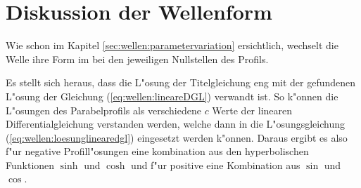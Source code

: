 \section{Diskussion der Wellenform}
\label{sec:wellen:diskussionwellenform}

Wie schon im Kapitel \ref{sec:wellen:parametervariation} ersichtlich, 
wechselt die Welle ihre Form im bei den jeweiligen Nullstellen des Profils.

Es stellt sich heraus, dass die L"osung der Titelgleichung eng mit der 
gefundenen L"osung der Gleichung (\ref{eq:wellen:lineareDGL}) verwandt ist. So 
k"onnen die L"osungen des Parabelprofils als verschiedene $c$ Werte der 
linearen Differentialgleichung verstanden werden, welche dann in die 
L"osungsgleichung (\ref{eq:wellen:loesunglinearedgl}) eingesetzt werden 
k"onnen. Daraus ergibt es also f"ur negative Profill"osungen eine kombination 
aus den hyperbolischen Funktionen $\sinh$ und $\cosh$ und f"ur positive eine 
Kombination aus $\sin$ und $\cos$.
